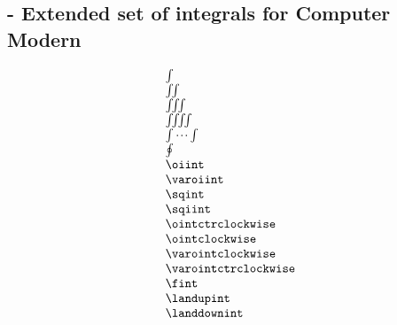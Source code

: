
\subsection{ - Extended set of integrals for Computer Modern}

\begin{demo}{}{}
	\begin{equation*}
		\begin{array}{l}
			\int                 \\
			\iint                \\
			\iiint               \\
			\iiiint              \\
			\idotsint            \\
			\oint                \\
			\oiint               \\
			\varoiint            \\
			\sqint               \\
			\sqiint              \\
			\ointctrclockwise    \\
			\ointclockwise       \\
			\varointclockwise    \\
			\varointctrclockwise \\
			\fint                \\
			\landupint           \\
			\landdownint         \\
		\end{array}
	\end{equation*}
\end{demo}
